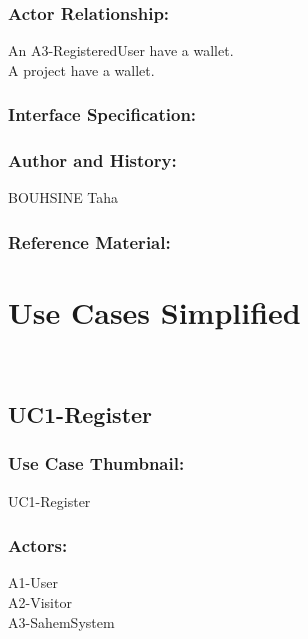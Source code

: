 \documentclass[11pt, openany]{report}
\begin{document}
\subsubsection{Actor Relationship:}
An A3-RegisteredUser have a wallet.\\
A project have a wallet.
\subsubsection{Interface Specification:}
\subsubsection{Author and History:}
BOUHSINE Taha
\subsubsection{Reference Material:}

\clearpage

\section{Use Cases Simplified}
\

\subsection{UC1-Register}
\label{sUC1}
\subsubsection*{Use Case Thumbnail:}
UC1-Register
\subsubsection*{Actors:}
A1-User\\
A2-Visitor\\
A3-SahemSystem
\end{document}
